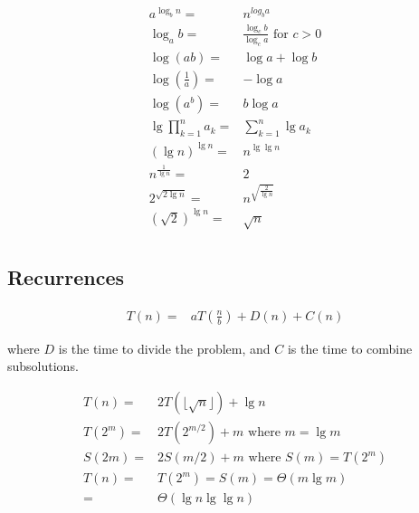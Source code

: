 \documentclass[10pt, a4paper,landscape]{article}
\begin{document}
\begin{multicols*}{4}
\begin{align*}
    a^{\log_b n} =& n^{log_b a}\\
    \log_a b =& \frac{\log_c b}{\log_c a} \text{ for } c > 0\\
    \log(ab) =& \log a + \log b\\
    \log(\frac{1}{a}) =& -\log a\\
    \log(a^b) =& b \log a\\
    \lg \prod_{k = 1}^{n} a_k =& \sum_{k = 1}^{n} \lg a_k\\
    (\lg n)^{\lg n} =& n^{\lg \lg n}\\
    n^{\frac{1}{\lg n}} =& 2\\
    2^{\sqrt{2 \lg n}} =& n^{\sqrt{\frac{2}{\lg n}}}\\
    (\sqrt{2})^{\lg n} =& \sqrt{n}\\
\end{align*}

\subsection{Recurrences}
\begin{align*}
    T(n) =& aT(\frac{n}{b}) + D(n) + C(n)
\end{align*}

where $D$ is the time to divide the problem, and $C$ is the time to combine subsolutions.


\begin{align*}
    T(n) =& 2T(\lfloor \sqrt{n} \rfloor) + \lg n\\
    T(2^m) =& 2T(2^{m/2}) + m \text{ where } m = \lg m\\
    S(2m) =& 2S(m / 2) + m \text{ where } S(m) = T(2^m)\\
    T(n) =& T(2^m) = S(m) = \Theta(m \lg m)\\
        =& \Theta(\lg n \lg \lg n)
\end{align*}



\end{multicols*}
\end{document}
